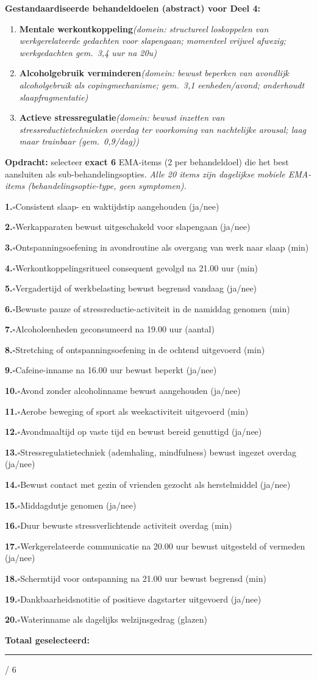 \documentclass[11pt,a4paper]{article}
\newcommand{\checkitemBFS}[2]{%
\noindent\small\textbf{#1.}\hspace{0.45em}$\square$\hspace{0.4em}#2\par\vspace{0.20em}}
\begin{document}
\begin{contextbox}
\small\textbf{Gestandaardiseerde behandeldoelen (abstract) voor Deel 4:}
\begin{enumerate}[topsep=2pt,itemsep=1pt,label=\arabic*.]
\item \textbf{Mentale werkontkoppeling}\quad\textit{\small (domein: structureel loskoppelen van werkgerelateerde gedachten voor slapengaan; momenteel vrijwel afwezig; werkgedachten gem.\ 3,4 uur na 20u)}
\item \textbf{Alcoholgebruik verminderen}\quad\textit{\small (domein: bewust beperken van avondlijk alcoholgebruik als copingmechanisme; gem.\ 3,1 eenheden/avond; onderhoudt slaapfragmentatie)}
\item \textbf{Actieve stressregulatie}\quad\textit{\small (domein: bewust inzetten van stressreductietechnieken overdag ter voorkoming van nachtelijke arousal; laag maar trainbaar (gem.\ 0,9/dag))}
\end{enumerate}
\end{contextbox}

\begin{responsebox}
\small\textbf{Opdracht:} selecteer \textbf{exact 6} EMA-items (2 per behandeldoel) die het best aansluiten als sub-behandelingsopties.
\textit{Alle 20 items zijn dagelijkse mobiele EMA-items (behandelingsoptie-type, geen symptomen).}

\checkitemBFS{1}{Consistent slaap- en waktijdstip aangehouden (ja/nee)}
\checkitemBFS{2}{Werkapparaten bewust uitgeschakeld voor slapengaan (ja/nee)}
\checkitemBFS{3}{Ontspanningsoefening in avondroutine als overgang van werk naar slaap (min)}
\checkitemBFS{4}{Werkontkoppelingsritueel consequent gevolgd na 21.00 uur (min)}
\checkitemBFS{5}{Vergadertijd of werkbelasting bewust begrensd vandaag (ja/nee)}
\checkitemBFS{6}{Bewuste pauze of stressreductie-activiteit in de namiddag genomen (min)}
\checkitemBFS{7}{Alcoholeenheden geconsumeerd na 19.00 uur (aantal)}
\checkitemBFS{8}{Stretching of ontspanningsoefening in de ochtend uitgevoerd (min)}
\checkitemBFS{9}{Cafeine-inname na 16.00 uur bewust beperkt (ja/nee)}
\checkitemBFS{10}{Avond zonder alcoholinname bewust aangehouden (ja/nee)}
\checkitemBFS{11}{Aerobe beweging of sport als weekactiviteit uitgevoerd (min)}
\checkitemBFS{12}{Avondmaaltijd op vaste tijd en bewust bereid genuttigd (ja/nee)}
\checkitemBFS{13}{Stressregulatietechniek (ademhaling, mindfulness) bewust ingezet overdag (ja/nee)}
\checkitemBFS{14}{Bewust contact met gezin of vrienden gezocht als herstelmiddel (ja/nee)}
\checkitemBFS{15}{Middagdutje genomen (ja/nee)}
\checkitemBFS{16}{Duur bewuste stressverlichtende activiteit overdag (min)}
\checkitemBFS{17}{Werkgerelateerde communicatie na 20.00 uur bewust uitgesteld of vermeden (ja/nee)}
\checkitemBFS{18}{Schermtijd voor ontspanning na 21.00 uur bewust begrensd (min)}
\checkitemBFS{19}{Dankbaarheidsnotitie of positieve dagstarter uitgevoerd (ja/nee)}
\checkitemBFS{20}{Waterinname als dagelijks welzijnsgedrag (glazen)}
\vspace{0.4em}
\noindent\textbf{Totaal geselecteerd:}\hspace{0.5em}\rule{1.2cm}{0.25pt}\hspace{0.2em}/ 6
\end{responsebox}
\end{document}
